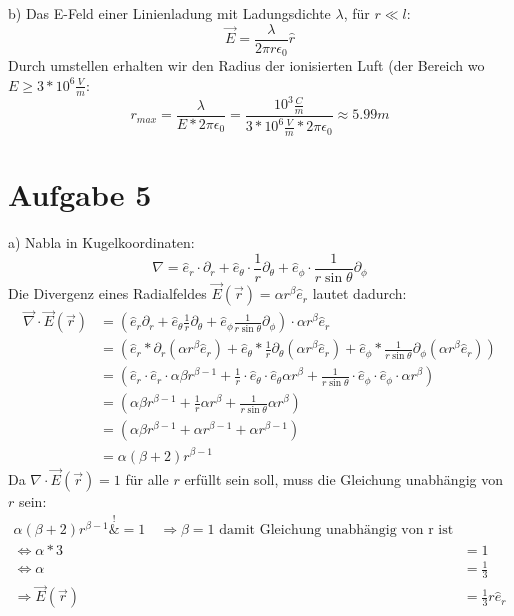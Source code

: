 \documentclass[a4paper]{article}
\newcommand{\delr}{\partial_r}
\newcommand{\delp}{\partial_\phi}
\newcommand{\delt}{\partial_\theta}
\newcommand{\er}{\hat{e}_r}
\newcommand{\et}{\hat{e}_\theta}
\newcommand{\ep}{\hat{e}_\phi}
\begin{document}
\par{b)}
Das E-Feld einer Linienladung mit Ladungsdichte $\lambda$, für $r \ll l$:
\[
	\vec E = \frac \lambda {2 \pi r \epsilon_0} \hat r
\]
Durch umstellen erhalten wir den Radius der ionisierten Luft (der Bereich wo $E \geq 3 * 10^6 \frac{V}{m} $:
\[
	r_{max} = \frac \lambda {E * 2 \pi \epsilon_0} = \frac{10^3 \frac C m}{3 * 10^6 \frac{V}{m} * 2 \pi \epsilon_0} \approx 5.99 m
	\] 

\newpage

\section*{Aufgabe 5}
\par{a)}
Nabla in Kugelkoordinaten:
\[ \nabla = \er \cdot \delr + \et \cdot \frac{1}{r} \delt + \ep \cdot \frac{1}{r \sin\theta} \delp \]
Die Divergenz eines Radialfeldes $\vec{E}(\vec{r}) = \alpha r^\beta \er$ lautet dadurch:
\begin{align*}
	\vec{\nabla} \cdot \vec{E}(\vec{r}) 
	&= \left(  \er \delr + \et \frac{1}{r} \delt + \ep  \frac{1}{r \sin\theta} \delp \right) \cdot \alpha r^\beta \er \\
	&= \left(\er * \delr (\alpha r^\beta \er )
		+ \et * \frac{1}{r} \delt (\alpha r^\beta \er )
		+ \ep * \frac{1}{r\sin\theta} \delp (\alpha r^\beta \er) \right) \\
	&= \left(\er \cdot \er \cdot \alpha \beta r^{\beta - 1}
		+ \frac{1}{r} \cdot \et \cdot \et \alpha r^\beta
		+ \frac{1}{r\sin\theta} \cdot \ep \cdot \ep \cdot \alpha r^\beta \right) \\
	&= \left(\alpha \beta r^{\beta - 1}
		+ \frac{1}{r} \alpha r^\beta
		+ \frac{1}{r\sin\theta}  \alpha r^\beta \right) \\
	&= \left( \alpha\beta r^{\beta - 1} +\alpha r^{\beta - 1} +\alpha r^{\beta - 1} \right) \\
	&= \alpha (\beta + 2) r^{\beta - 1}
\end{align*}
Da $\nabla \cdot \vec{E}(\vec{r}) = 1$ für alle $r$ erfüllt sein soll, muss die Gleichung unabhängig von $r$ sein:
\begin{align*}
	\alpha (\beta + 2) r^{\beta - 1} \overset{!}&{=} 1
	\quad \Rightarrow
	\beta = 1 \text{ damit Gleichung unabhängig von r ist}
	\\
	\Leftrightarrow
	\alpha * 3 &= 1 \\
	\Leftrightarrow
	\alpha &= \frac{1}{3} \\
	\Rightarrow \vec{E}(\vec{r}) &= \frac{1}{3} r \hat{e}_r
\end{align*}
\end{document}
